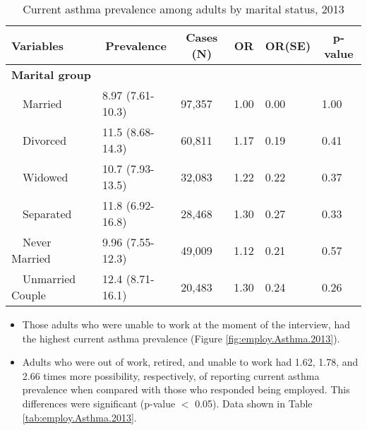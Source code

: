 \begin{table}[H]
\caption{Current asthma prevalence  among adults by marital status, 2013\label{tab:marital.Asthma.2013}} 
\begin{center}
\begin{tabular}{llllll}
\hline\hline
\multicolumn{1}{l}{Variables}&\multicolumn{1}{c}{Prevalence}&\multicolumn{1}{c}{Cases (N)}&\multicolumn{1}{c}{OR}&\multicolumn{1}{c}{OR(SE)}&\multicolumn{1}{c}{p-value}\tabularnewline
\hline
{\bfseries Marital group}&&&&&\tabularnewline
~~Married&8.97 (7.61-10.3)&97,357&1.00&0.00&1.00\tabularnewline
~~Divorced&11.5 (8.68-14.3)&60,811&1.17&0.19&0.41\tabularnewline
~~Widowed&10.7 (7.93-13.5)&32,083&1.22&0.22&0.37\tabularnewline
~~Separated&11.8 (6.92-16.8)&28,468&1.30&0.27&0.33\tabularnewline
~~Never Married&9.96 (7.55-12.3)&49,009&1.12&0.21&0.57\tabularnewline
~~Unmarried Couple&12.4 (8.71-16.1)&20,483&1.30&0.24&0.26\tabularnewline
\hline
\end{tabular}\end{center}

\end{table}

 
 \newpage
\begin{itemize}


\item Those adults who were 
unable to work at the moment of the interview, had the highest current asthma prevalence (Figure \ref{fig:employ.Asthma.2013}).

\item Adults who were out of work, retired, and unable to work had 1.62, 1.78, and 2.66 times more possibility, respectively, of reporting current asthma prevalence when compared with those who responded being employed. This differences were significant (p-value $<$ 0.05). 
Data shown in Table \ref{tab:employ.Asthma.2013}.


\end{itemize}

